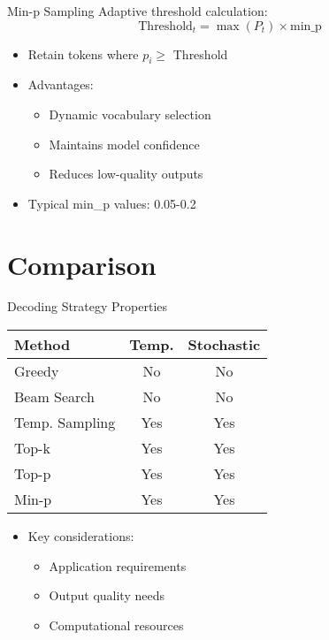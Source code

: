 \documentclass{beamer}
\begin{document}
\begin{frame}{Min-p Sampling}
Adaptive threshold calculation:
\[
\text{Threshold}_t = \max(P_t) \times \text{min\_p}
\]
\begin{itemize}
\item Retain tokens where $p_i \geq$ Threshold
\item Advantages:
\begin{itemize}
\item Dynamic vocabulary selection
\item Maintains model confidence
\item Reduces low-quality outputs
\end{itemize}
\item Typical min\_p values: 0.05-0.2
\end{itemize}
\end{frame}

\section{Comparison}

\begin{frame}{Decoding Strategy Properties}
\begin{table}
\centering
\begin{tabular}{lcc}
\textbf{Method} & \textbf{Temp.} & \textbf{Stochastic} \\ \hline
Greedy & No & No \\
Beam Search & No & No \\
Temp. Sampling & Yes & Yes \\
Top-k & Yes & Yes \\
Top-p & Yes & Yes \\
Min-p & Yes & Yes \\
\end{tabular}
\end{table}
\begin{itemize}
\item Key considerations:
\begin{itemize}
\item Application requirements
\item Output quality needs
\item Computational resources
\end{itemize}
\end{itemize}
\end{frame}
\end{document}
